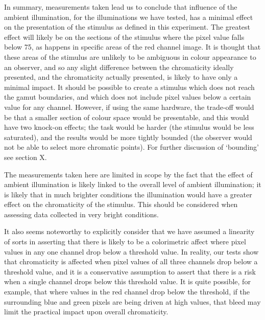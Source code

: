 In summary, measurements taken lead us to conclude that influence of the ambient illumination, for the illuminations we have tested, has a minimal effect on the presentation of the stimulus as defined in this experiment. 
The greatest effect will likely be on the sections of the stimulus where the pixel value falls below 75, as happens in specific areas of the red channel image. It is thought that these areas of the stimulus are unlikely to be ambiguous in colour appearance to an observer, and so any slight difference between the chromaticity ideally presented, and the chromaticity actually presented, is likely to have only a minimal impact. 
It should be possible to create a stimulus which does not reach the gamut boundaries, and which does not include pixel values below a certain value for any channel. However, if using the same hardware, the trade-off would be that a smaller section of colour space would be presentable, and this would have two knock-on effects; the task would be harder (the stimulus would be less saturated), and the results would be more tightly bounded (the observer would not be able to select more chromatic points). For further discussion of `bounding' see section X.

The measurements taken here are limited in scope by the fact that the effect of ambient illumination is likely linked to the overall level of ambient illumination; it is likely that in much brighter conditions the illumination would have a greater effect on the chromaticity of the stimulus. This should be considered when assessing data collected in very bright conditions.

It also seems noteworthy to explicitly consider that we have assumed a linearity of sorts in asserting that there is likely to be a colorimetric affect where pixel values in any one channel drop below a threshold value. In reality, our tests show that chromaticity is affected when pixel values of all three channels drop below a threshold value, and it is a conservative assumption to assert that there is a risk when a single channel drops below this threshold value. It is quite possible, for example, that where values in the red channel drop below the threshold, if the surrounding blue and green pixels are being driven at high values, that bleed may limit the practical impact upon overall chromaticity.


